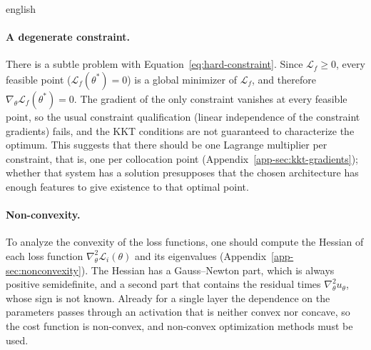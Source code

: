 \documentclass[11pt,letterpaper,twoside,openright]{book} %
\newcommand{\Loss}{\mathcal{L}}
\newif\ifreviewmode
\newcommand{\revtag}[2]{\ifreviewmode{\color{red!70!black}\textsf{\footnotesize[#1#2]}}\fi}
\newcommand{\verificar}[1]{\revtag{VERIFICAR}{: #1}}
\begin{document}
\begin{hyphenrules}{english}
\paragraph{A degenerate constraint.}
There is a subtle problem with Equation~\eqref{eq:hard-constraint}. Since $\Loss_f\ge0$, every feasible point
($\Loss_f(\theta^{*})=0$) is a global minimizer of $\Loss_f$, and therefore $\nabla_\theta\Loss_f(\theta^{*})=0$.
The gradient of the only constraint vanishes at every feasible point, so the usual constraint
qualification (linear independence of the constraint gradients) fails, and the KKT conditions are not
guaranteed to characterize the optimum.\verificar{add a reference on constraint qualifications, e.g.\
Nocedal \& Wright} This suggests that there should be one Lagrange multiplier per constraint, that is,
one per collocation point (Appendix~\ref{app-sec:kkt-gradients}); whether that system has a solution
presupposes that the chosen architecture has enough features to give existence to that optimal point.

\paragraph{Non-convexity.}
To analyze the convexity of the loss functions, one should compute the Hessian of each loss function
$\nabla^2_\theta\Loss_i(\theta)$ and its eigenvalues (Appendix~\ref{app-sec:nonconvexity}). The Hessian has
a Gauss--Newton part, which is always positive semidefinite, and a second part that contains the
residual times $\nabla^2_\theta u_\theta$, whose sign is not known. Already for a single layer the
dependence on the parameters passes through an activation that is neither convex nor concave, so the
cost function is non-convex, and non-convex optimization methods must be used.


\end{hyphenrules}
\end{document}
